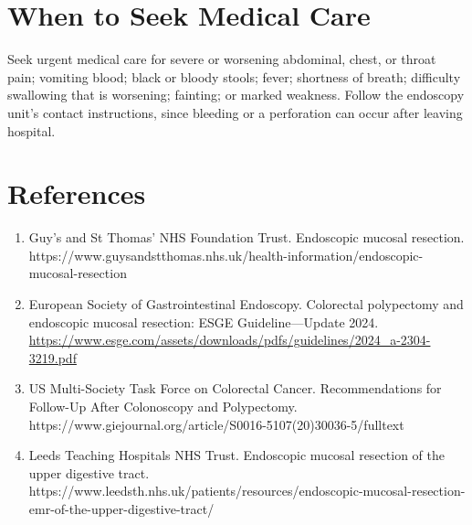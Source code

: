 \section*{When to Seek Medical Care}
Seek urgent medical care for severe or worsening abdominal, chest, or throat pain; vomiting blood; black or bloody stools; fever; shortness of breath; difficulty swallowing that is worsening; fainting; or marked weakness. Follow the endoscopy unit's contact instructions, since bleeding or a perforation can occur after leaving hospital.

\section*{References}
\begin{enumerate}
  \item Guy's and St Thomas' NHS Foundation Trust. Endoscopic mucosal resection. https://www.guysandstthomas.nhs.uk/health-information/endoscopic-mucosal-resection
  \item European Society of Gastrointestinal Endoscopy. Colorectal polypectomy and endoscopic mucosal resection: ESGE Guideline—Update 2024. \url{https://www.esge.com/assets/downloads/pdfs/guidelines/2024_a-2304-3219.pdf}
  \item US Multi-Society Task Force on Colorectal Cancer. Recommendations for Follow-Up After Colonoscopy and Polypectomy. https://www.giejournal.org/article/S0016-5107(20)30036-5/fulltext
  \item Leeds Teaching Hospitals NHS Trust. Endoscopic mucosal resection of the upper digestive tract. https://www.leedsth.nhs.uk/patients/resources/endoscopic-mucosal-resection-emr-of-the-upper-digestive-tract/
\end{enumerate}

\clearpage

